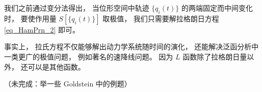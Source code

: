 
\begin{issues}
\issueDraft
\end{issues}


我们之前通过变分法得出， 当位形空间中轨迹 $\{q_i(t)\}$ 的两端固定而中间变化时， 要使作用量 $S[\{q_i(t)\}]$ 取极值， 我们只需要解拉格朗日方程\autoref{eq_HamPrn_2} 即可。

事实上， 拉氏方程不仅能够解出动力学系统随时间的演化， 还能解决泛函分析中一类更广的极值问题， 例如著名的速降线问题。 因为 $L$ 函数除了拉格朗日量以外， 还可以是其他函数。

（未完成：举一些 Goldstein 中的例题）
